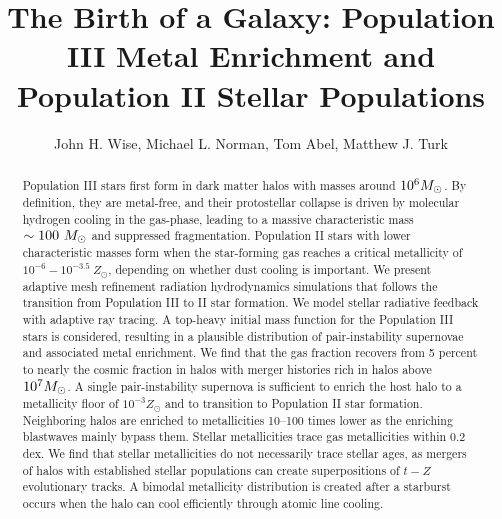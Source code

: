 \documentclass[apjl]{emulateapj}
\begin{document}

\title{The Birth of a Galaxy: Population III Metal Enrichment and
  Population II Stellar Populations}

\author{John H. Wise, 
  Michael L. Norman,
  Tom Abel,
  Matthew J. Turk}


\begin{abstract}

  Population III stars first form in dark matter halos with masses
  around $10^6 \Ms$.  By definition, they are metal-free, and their
  protostellar collapse is driven by molecular hydrogen cooling in the
  gas-phase, leading to a massive characteristic mass $\sim 100~\Ms$
  and suppressed fragmentation.  Population II stars with lower
  characteristic masses form when the star-forming gas reaches a
  critical metallicity of $10^{-6} - 10^{-3.5}~Z_\odot$, depending on
  whether dust cooling is important.  We present adaptive mesh
  refinement radiation hydrodynamics simulations that follows the
  transition from Population III to II star formation.  We model
  stellar radiative feedback with adaptive ray tracing.  A top-heavy
  initial mass function for the Population III stars is considered,
  resulting in a plausible distribution of pair-instability supernovae
  and associated metal enrichment.  We find that the gas fraction
  recovers from 5 percent to nearly the cosmic fraction in halos with
  merger histories rich in halos above $10^7 \Ms$.  A single
  pair-instability supernova is sufficient to enrich the host halo to
  a metallicity floor of $10^{-3} Z_\odot$ and to transition to
  Population II star formation.  Neighboring halos are enriched to
  metallicities 10--100 times lower as the enriching blastwaves mainly
  bypass them.  Stellar metallicities trace gas metallicities within
  0.2 dex.  We find that stellar metallicities do not necessarily
  trace stellar ages, as mergers of halos with established stellar
  populations can create superpositions of $t-Z$ evolutionary tracks.
  A bimodal metallicity distribution is created after a starburst
  occurs when the halo can cool efficiently through atomic line
  cooling.

\end{abstract}
\end{document}
